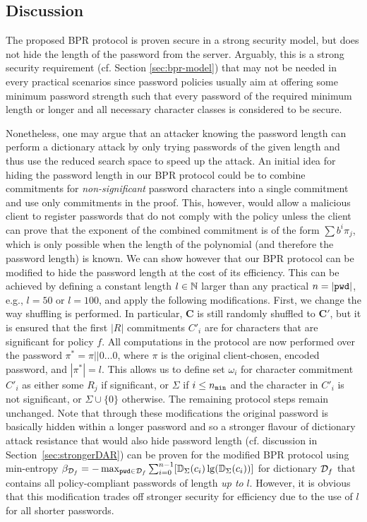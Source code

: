 \subsection{Discussion} \label{sec:bpr-discussion}
The proposed \ac{BPR} protocol is proven secure in a strong security model, but does not hide the length of the password from the server.
Arguably, this is a strong security requirement (cf. Section \ref{sec:bpr-model}) that may not be needed in every practical scenarios since password policies usually aim at offering some minimum password strength such that every password of the required minimum length or longer and all necessary character classes is considered to be secure.

Nonetheless, one may argue that an attacker knowing the password length can perform a dictionary attack by only trying passwords of the given length and thus use the reduced search space to speed up the attack. An initial idea for hiding the password length in our \ac{BPR} protocol could be to combine commitments for \emph{non-significant} password characters into a single commitment and use only \pmin commitments in the proof. This, however, would allow a malicious client to register passwords that do not comply with the policy unless the client can prove that the exponent of the combined commitment is of the form $\sum b^i\pi_j$, which is only possible when the length of the polynomial (and therefore the password length) is known.
We can show however that our \ac{BPR} protocol can be modified to hide the password length at the cost of its efficiency. This can be achieved by defining a constant length $l\in\mathbb{N}$ larger than any practical $n=|\mathtt{pwd}|$, e.g., $l=50$ or $l=100$, and apply the following modifications. First, we change the way shuffling is performed.
In particular, $\bm C$ is still randomly shuffled to $\bm C'$, but it is ensured that the first $|R|$ commitments $C'_i$ are for characters that are significant for policy $f$.
All computations in the protocol are now performed over the password $\pi^\ast=\pi||0\dots 0$, where $\pi$ is the original client-chosen, encoded password, and $|\pi^\ast|=l$.
This allows us to define set $\omega_i$ for character commitment $C'_i$ as either some $R_j$ if significant, or $\Sigma$ if $i\leq{n_\mathtt{min}}$ and the character in $C'_i$ is not significant, or $\Sigma \cup \{0\}$ otherwise. 
The remaining protocol steps remain unchanged.
Note that through these modifications the original password is basically hidden within a longer password and so a stronger flavour of dictionary attack resistance that would also hide password length (cf. discussion in Section~\ref{sec:strongerDAR}) can be proven for the modified \ac{BPR} protocol using min-entropy
$\beta_{\mathcal{D}_{f}} = -\max_{\mathtt{pwd}\in \mathcal{D}_{f}} \sum_{i=0}^{n-1} [\mathbb{D}_\Sigma(c_i)\lg(\mathbb{D}_\Sigma(c_i))]$
for dictionary $\mathcal{D}_{f}$ that contains all policy-compliant passwords of length \emph{up to} $l$.
However, it is obvious that this modification trades off stronger security for efficiency due to the use of $l$ for all shorter passwords.

